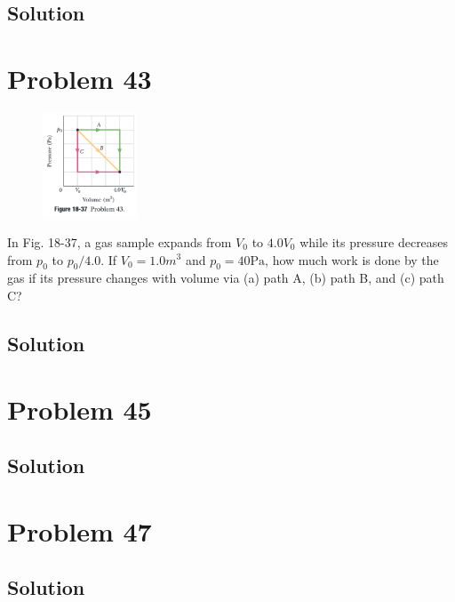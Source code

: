 \documentclass[12pt]{article}
\begin{document}
        \subsection{Solution}

    \pagebreak
    \section{Problem 43}
        \begin{figure}
            \vspace{-30pt}
            \includegraphics[width=0.25\textwidth]{picture_18-37.png} 
        \end{figure}
        In Fig. 18-37, a gas sample expands from $V_0$ to $4.0 V_0$ while its pressure decreases from $p_0$ to $p_0/4.0$. 
        If $V_0 = 1.0 m^3$ and $p_0 = 40 \unit{\pascal}$, how much work is done by the gas if its pressure changes with volume via (a) path A, (b) path B, and (c) path C?

        \subsection{Solution}

    \pagebreak
    \section{Problem 45}

    \subsection{Solution}

    \pagebreak
    \section{Problem 47}

    \subsection{Solution}
\end{document}
